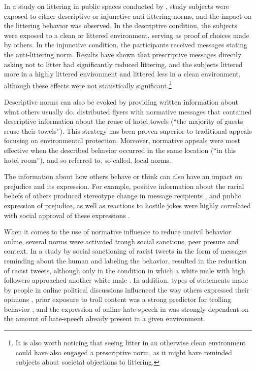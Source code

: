 \documentclass[preprint,12pt]{elsarticle}
\begin{document}
In a study on littering in public spaces conducted by \citet{cialdini1990focus}, study subjects were exposed to either descriptive or injunctive anti-littering norms, and the impact on the littering behavior was observed. In the descriptive condition, the subjects were exposed to a clean or littered environment, serving as proof of choices made by others. In the injunctive condition, the participants received messages stating the anti-littering norm. Results have shown that prescriptive messages directly asking not to litter had significantly reduced littering, and the subjects littered more in a highly littered environment and littered less in a clean environment, although these effects were not statistically significant.\footnote{It is also worth noticing that seeing litter in an otherwise clean environment could have also engaged a prescriptive norm, as it might have reminded subjects about societal objections to littering.}

Descriptive norms can also be evoked by providing written information about what others usually do. \citet{goldstein2008room} distributed flyers with normative messages that contained descriptive information about the reuse of hotel towels (“the majority of guests reuse their towels”). This strategy has been proven superior to traditional appeals focusing on environmental protection. Moreover, normative appeals were most effective when the described behavior occurred in the same location (“in this hotel room”), and so referred to, so-called, local norms.  


The information about how others behave or think can also have an impact on prejudice and its expression. For example, positive information about the racial beliefs of others produced stereotype change in message recipients \citep{stangor2001changing}, and public expression of prejudice, as well as reactions to hostile jokes were highly correlated with social approval of these expressions \citep{crandall2002social}.



When it comes to the use of normative influence to reduce uncivil behavior online, several norms were activated trough social sanctions,  peer presure and context. In a study by  \citet{munger2017tweetment} social sanctioning of racist tweets in the form of messages reminding about the human and labeling the behavior, resulted in the reduction of racist tweets, although only in the condition in which a white male with high followers  approached another white male \citep{munger2017tweetment}. 
In addition, types of statements made by people in online political discussions influenced the way others expressed their opinions \citep{price2006normative}, prior exposure to troll content was a strong predictor for trolling behavior \citep{cheng2017anyone}, and the expression of online hate-speech in \citep{alvarez2018normative} was strongly dependent on the amount of hate-speech already present in a given environment.  
\end{document}
